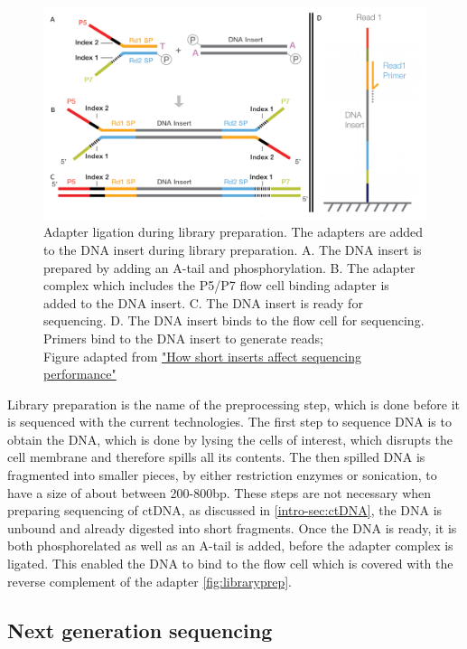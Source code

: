 \begin{figure}[!ht]
\centering
\includegraphics[width=.9\linewidth]{Figures/LibraryPreparation.png}
\caption[Library preparation for NGS]{Adapter ligation during library preparation. The adapters are added to the DNA insert during library preparation. A. The DNA insert is prepared by adding an A-tail and phosphorylation. B. The adapter complex which includes the P5/P7 flow cell binding adapter is added to the DNA insert. C. The DNA insert is ready for sequencing. D. The DNA insert binds to the flow cell for sequencing. Primers bind to the DNA insert to generate reads; \\Figure adapted from \href{https://sapac.support.illumina.com/bulletins/2020/12/how-short-inserts-affect-sequencing-performance.html}{"How short inserts affect sequencing performance"}\protect\cite{Illumina2020}}\label{fig:libraryprep}
\end{figure}

Library preparation is the name of the preprocessing step, which is done before it is sequenced with the current technologies. The first step to sequence DNA is to obtain the DNA, which is done by lysing the cells of interest, which disrupts the cell membrane and therefore spills all its contents. The then spilled DNA is fragmented into smaller pieces, by either restriction enzymes or sonication, to have a size of about between 200-800bp. These steps are not necessary when preparing sequencing of ctDNA, as discussed in \autoref{intro-sec:ctDNA}, the DNA is unbound and already digested into short fragments.
Once the DNA is ready, it is both phosphorelated as well as an A-tail is added, before the adapter complex is ligated. This enabled the DNA to bind to the flow cell which is covered with the reverse complement of the adapter \autoref{fig:libraryprep}. 

\subsection{Next generation sequencing}
\label{intro-sec:ngs}

